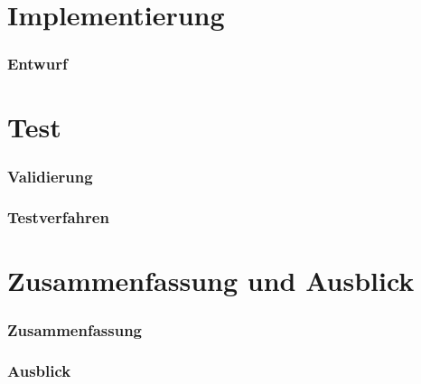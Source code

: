 \documentclass[11pt, a4paper]{scrreprt}
\begin{document}
\part{Implementierung}
\section{Entwurf}

\part{Test}
\section{Validierung}
\section{Testverfahren}

\part{Zusammenfassung und Ausblick}
\section{Zusammenfassung}
\section{Ausblick}

\end{document}
